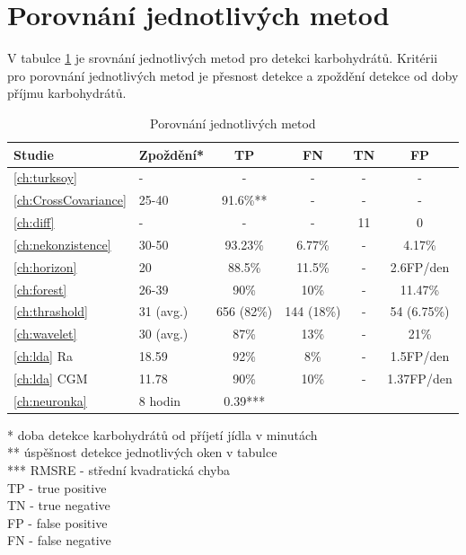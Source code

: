 \section{Porovnání jednotlivých metod}

V tabulce \ref{tab:res} je srovnání jednotlivých metod pro detekci karbohydrátů. Kritérii pro porovnání jednotlivých metod je přesnost detekce a zpoždění detekce od doby příjmu karbohydrátů.

\begin{table}[H]
\caption{Porovnání jednotlivých metod}
\label{tab:res}
\hskip-1.0cm
\begin{tabular}{|l|l|c|c|c|c|}
\hline 
\textbf{Studie} & \textbf{Zpoždění*} & \textbf{TP} & \textbf{FN} & \textbf{TN} & \textbf{FP}\tabularnewline
\hline 
\hline 
\ref{ch:turksoy} \citet{Analyza.Turksoy} & - & - & - & - & -\tabularnewline
\hline 
\ref{ch:CrossCovariance} \citet{Analyza.CrossCovariance} & 25-40 & 91.6\%{**} & - & - & -\tabularnewline
\hline 
\ref{ch:diff} \citet{Analyza.Diff} & - & - & - & 11 & 0\tabularnewline
\hline 
\ref{ch:nekonzistence} \citet{Analyza.Nekonzistence} & 30-50 & 93.23\% & 6.77\% & - & 4.17\%\tabularnewline
\hline
\ref{ch:horizon} \citet{Analyza.MovingHorizon} & 20 & 88.5\% & 11.5\% & - & 2.6FP/den\tabularnewline
\hline 
\ref{ch:forest} \citet{Analyza.ExtendedIsolationForest} & 26-39 & 90\% & 10\% & - & 11.47\%\tabularnewline
\hline 
\ref{ch:thrashold} \citet{Analyza.Thresholds} & 31 (avg.) & 656 (82\%) & 144 (18\%) & - & 54 (6.75\%)\tabularnewline
\hline 
\ref{ch:wavelet} \citet{Analyza.WaveletEst} & 30 (avg.) & 87\% & 13\% & - & 21\%\tabularnewline
\hline 
\ref{ch:lda} Ra \citet{Analyza.LDA} & 18.59 & 92\% & 8\% & - & 1.5FP/den\tabularnewline
\hline 
\ref{ch:lda} CGM \citet{Analyza.LDA} & 11.78 & 90\% & 10\% & - & 1.37FP/den\tabularnewline
\hline
\ref{ch:neuronka} \citet{Analyza.Neuronka} & 8 hodin & 0.39{***} & & & \tabularnewline
\hline
\end{tabular}
\begin{flushleft}
* doba detekce karbohydrátů od příjetí jídla v minutách\\
{**} úspěšnost detekce jednotlivých oken v tabulce\\
{***} RMSRE - střední kvadratická chyba\\
TP - true positive\\
TN - true negative\\
FP - false positive\\
FN - false negative\\
\end{flushleft}
\end{table}


